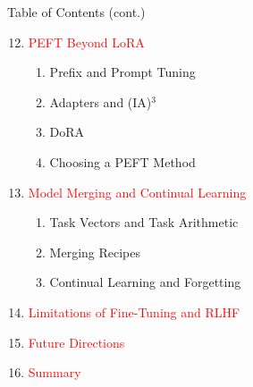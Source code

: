\begin{frame}[t]{Table of Contents (cont.)}
  \scriptsize
  \begin{enumerate}
    \setcounter{enumi}{11}
    \item \textcolor{red}{PEFT Beyond LoRA}
      \begin{enumerate}
        \scriptsize
        \item Prefix and Prompt Tuning
        \item Adapters and (IA)$^3$
        \item DoRA
        \item Choosing a PEFT Method
      \end{enumerate}
    \item \textcolor{red}{Model Merging and Continual Learning}
      \begin{enumerate}
        \scriptsize
        \item Task Vectors and Task Arithmetic
        \item Merging Recipes
        \item Continual Learning and Forgetting
      \end{enumerate}
    \item \textcolor{red}{Limitations of Fine-Tuning and RLHF}
    \item \textcolor{red}{Future Directions}
    \item \textcolor{red}{Summary}
  \end{enumerate}
\end{frame}
